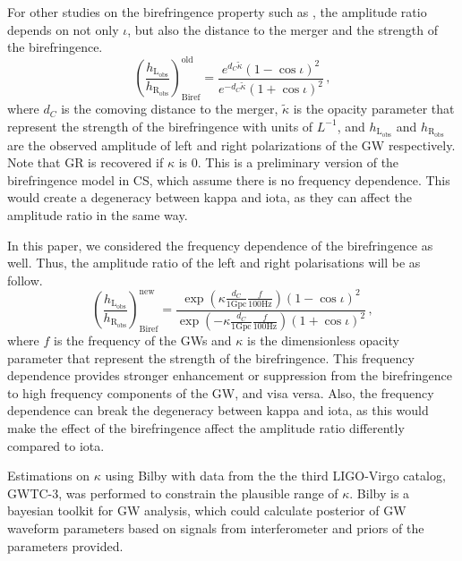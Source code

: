 \documentclass[twocolumn]{aastex631}
\begin{document}
For other studies on the birefringence property such as \citet{Maria_2021}, the amplitude ratio depends on not only $\iota$,
but also the distance to the merger and the strength of the birefringence.
\begin{equation}
    \left(\frac{h_\mathrm{L_{obs}}}{h_\mathrm{R_{obs}}}\right)_\mathrm{Biref}^\mathrm{old}=\frac{e^{d_C\widetilde{\kappa}}\left(1-\cos\iota\right)^2}{e^{-d_C\widetilde{\kappa}}\left(1+\cos\iota\right)^2}\,,
\end{equation}where $d_C$ is the comoving distance to the merger, $\widetilde{\kappa}$ is the opacity parameter that represent
the strength of the birefringence with units of $L^{-1}$, and $h_\mathrm{L_{obs}}$ and $h_\mathrm{R_{obs}}$ are
the observed amplitude of left and right polarizations of the GW respectively. Note that GR is recovered if $\kappa$ is 0.
This is a preliminary version of the birefringence model in CS, which assume there is no frequency dependence.
This would create a degeneracy between kappa and iota, as they can affect the amplitude ratio in the same way.

In this paper, we considered the frequency dependence of the birefringence as well.
Thus, the amplitude ratio of the left and right polarisations will be as follow.
\begin{equation}
    \left(\frac{h_\mathrm{L_{obs}}}{h_\mathrm{R_{obs}}}\right)_\mathrm{Biref}^\mathrm{new}=\frac{\exp\left({\kappa\frac{d_C}{1\mathrm{ Gpc}}\frac{f}{100\mathrm{ Hz}}}\right)\left(1-\cos\iota\right)^2}{\exp\left({-\kappa\frac{d_C}{1\mathrm{Gpc}}\frac{f}{100\mathrm{Hz}}}\right)\left(1+\cos\iota\right)^2}\,,
\end{equation}where $f$ is the frequency of the GWs and $\kappa$ is the dimensionless opacity parameter that represent the strength of the birefringence.
This frequency dependence provides stronger enhancement or suppression from the birefringence to high frequency components of the GW, and visa versa.
Also, the frequency dependence can break the degeneracy between kappa and iota,
as this would make the effect of the birefringence affect the amplitude ratio differently compared to iota.

Estimations on $\kappa$ using Bilby with data from the the third LIGO-Virgo catalog, GWTC-3, was performed to constrain the plausible range of $\kappa$.
Bilby is a bayesian toolkit for GW analysis, which could calculate posterior of GW waveform parameters based on signals from
interferometer and priors of the parameters provided. \citep{Ashton_2019}
\end{document}
